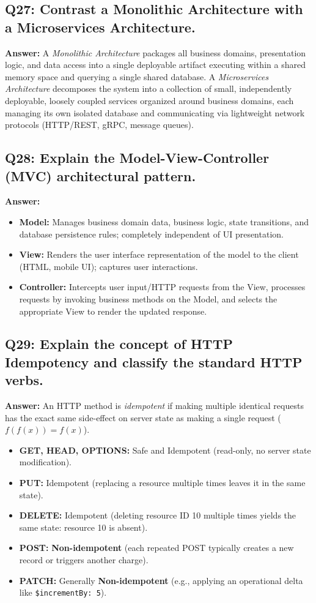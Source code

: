 \subsection*{Q27: Contrast a Monolithic Architecture with a Microservices Architecture.}
\textbf{Answer:} A \textit{Monolithic Architecture} packages all business domains, presentation logic, and data access into a single deployable artifact executing within a shared memory space and querying a single shared database. A \textit{Microservices Architecture} decomposes the system into a collection of small, independently deployable, loosely coupled services organized around business domains, each managing its own isolated database and communicating via lightweight network protocols (HTTP/REST, gRPC, message queues).

\subsection*{Q28: Explain the Model-View-Controller (MVC) architectural pattern.}
\textbf{Answer:}
\begin{itemize}
    \item \textbf{Model:} Manages business domain data, business logic, state transitions, and database persistence rules; completely independent of UI presentation.
    \item \textbf{View:} Renders the user interface representation of the model to the client (HTML, mobile UI); captures user interactions.
    \item \textbf{Controller:} Intercepts user input/HTTP requests from the View, processes requests by invoking business methods on the Model, and selects the appropriate View to render the updated response.
\end{itemize}

\subsection*{Q29: Explain the concept of HTTP Idempotency and classify the standard HTTP verbs.}
\textbf{Answer:} An HTTP method is \textit{idempotent} if making multiple identical requests has the exact same side-effect on server state as making a single request ($f(f(x)) = f(x)$).
\begin{itemize}
    \item \textbf{GET, HEAD, OPTIONS:} Safe and Idempotent (read-only, no server state modification).
    \item \textbf{PUT:} Idempotent (replacing a resource multiple times leaves it in the same state).
    \item \textbf{DELETE:} Idempotent (deleting resource ID 10 multiple times yields the same state: resource 10 is absent).
    \item \textbf{POST:} \textbf{Non-idempotent} (each repeated POST typically creates a new record or triggers another charge).
    \item \textbf{PATCH:} Generally \textbf{Non-idempotent} (e.g., applying an operational delta like \lstinline|$incrementBy: 5|).
\end{itemize}

